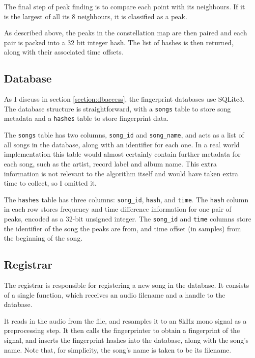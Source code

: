 \documentclass[12pt,a4paper,twoside,openright]{report}
\begin{document}
The final step of peak finding is to compare each point with its neighbours. If it is the largest of all its 8 neighbours, it is classified as a peak.

As described above, the peaks in the constellation map are then paired and each pair is packed into a 32 bit integer hash. The list of hashes is then returned, along with their associated time offsets.


\subsection{Database}
\label{shazam:db}

As I discuss in section \ref{section:dbaccess}, the fingerprint databases use SQLite3. The database structure is straightforward, with a \lstinline{songs} table to store song metadata and a \lstinline{hashes} table to store fingerprint data.

The \lstinline{songs} table has two columns, \lstinline{song_id} and \lstinline{song_name}, and acts as a list of all songs in the database, along with an identifier for each one. In a real world implementation this table would almost certainly contain further metadata for each song, such as the artist, record label and album name. This extra information is not relevant to the algorithm itself and would have taken extra time to collect, so I omitted it.

The \lstinline{hashes} table has three columns: \lstinline{song_id}, \lstinline{hash}, and \lstinline{time}. The \lstinline{hash} column in each row stores frequency and time difference information for one pair of peaks, encoded as a 32-bit unsigned integer. The \lstinline{song_id} and \lstinline{time} columns store the identifier of the song the peaks are from, and time offset (in samples) from the beginning of the song.


\subsection{Registrar}
\label{shazam:registrar}

The registrar is responsible for registering a new song in the database. It consists of a single function, which receives an audio filename and a handle to the database. 

It reads in the audio from the file, and resamples it to an 8kHz mono signal as a preprocessing step. It then calls the fingerprinter to obtain a fingerprint of the signal, and inserts the fingerprint hashes into the database, along with the song's name. Note that, for simplicity, the song's name is taken to be its filename.
\end{document}
